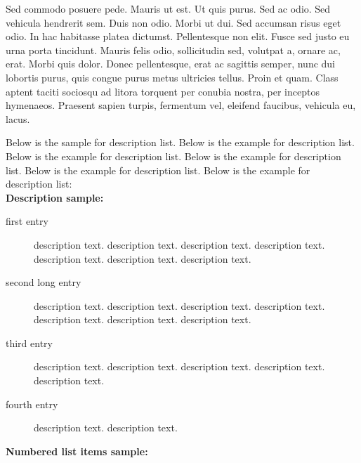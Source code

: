 \documentclass[APA,LATO1COL]{WileyNJD-v2}
\begin{document}
Sed commodo posuere pede. Mauris ut est. Ut quis purus. Sed ac odio. Sed vehicula hendrerit sem. Duis non
odio. Morbi ut dui. Sed accumsan risus eget odio. In hac habitasse platea dictumst. Pellentesque non elit. Fusce
sed justo eu urna porta tincidunt. Mauris felis odio, sollicitudin sed, volutpat a, ornare ac, erat. Morbi quis dolor. Donec pellentesque, erat ac sagittis semper, nunc dui lobortis purus, quis congue purus metus ultricies tellus. Proin
et quam. Class aptent taciti sociosqu ad litora torquent per conubia nostra, per inceptos hymenaeos. Praesent sapien
turpis, fermentum vel, eleifend faucibus, vehicula eu, lacus.


Below is the sample for description list. Below is the example for description list. Below is the example for description list. Below is the example for description list. Below is the example for description list. Below is the example for description list:\\[12pt]


\noindent\textbf{Description sample:}

\begin{description}
\item[first entry] description text. description text. description text. description text. description text. description text. description text. 
\item[second long entry] description text. description text. description text. description text. description text. description text. description text. 
\item[third entry] description text. description text. description text. description text. description text. 
\item[fourth entry] description text. description text. 
\end{description}


\noindent\textbf{Numbered list items sample:}
\end{document}
